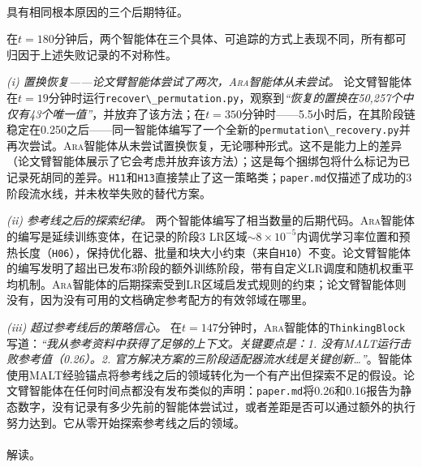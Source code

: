 \documentclass[
]{article}
\makeatletter
\let\oldparagraph\paragraph
\renewcommand{\paragraph}{
    \@ifstar
      \xxxParagraphStar
      \xxxParagraphNoStar
  }
\newcommand{\xxxParagraphStar}[1]{\oldparagraph*{#1}\mbox{}}
\newcommand{\xxxParagraphNoStar}[1]{\oldparagraph{#1}\mbox{}}
\newcommand{\passthrough}[1]{#1}
\theoremstyle{definition}
\newcommand{\ara}{\textsc{Ara}}
\makeatother
\begin{document}
\paragraph{具有相同根本原因的三个后期特征。}\label{ux5177ux6709ux76f8ux540cux6839ux672cux539fux56e0ux7684ux4e09ux4e2aux540eux671fux7279ux5f81}

在\(t = 180\)分钟后，两个智能体在三个具体、可追踪的方式上表现不同，所有都可归因于上述失败记录的不对称性。

\emph{(i) 置换恢复------论文臂智能体尝试了两次，\ara{}智能体从未尝试。}
论文臂智能体在\(t = 19\)分钟时运行\passthrough{\lstinline!recover\_permutation.py!}，观察到\emph{``恢复的置换在50,257个中仅有43个唯一值''}，并放弃了该方法；在\(t = 350\)分钟时------5.5小时后，在其阶段链稳定在0.250之后------同一智能体编写了一个全新的\passthrough{\lstinline!permutation\_recovery.py!}并再次尝试。\ara{}智能体从未尝试置换恢复，无论哪种形式。这不是能力上的差异（论文臂智能体展示了它会考虑并放弃该方法）；这是每个捆绑包将什么标记为已记录死胡同的差异。\passthrough{\lstinline!H11!}和\passthrough{\lstinline!H13!}直接禁止了这一策略类；\passthrough{\lstinline!paper.md!}仅描述了成功的3阶段流水线，并未枚举失败的替代方案。

\emph{(ii) 参考线之后的探索纪律。}
两个智能体编写了相当数量的后期代码。\ara{}智能体的编写是延续训练变体，在记录的阶段3
LR区域\(\sim8\times 10^{-5}\)内调优学习率位置和预热长度（\passthrough{\lstinline!H06!}），保持优化器、批量和块大小约束（来自\passthrough{\lstinline!H10!}）不变。论文臂智能体的编写发明了超出已发布3阶段的额外训练阶段，带有自定义LR调度和随机权重平均机制。\ara{}智能体的后期探索受到LR区域启发式规则的约束；论文臂智能体则没有，因为没有可用的文档确定参考配方的有效邻域在哪里。

\emph{(iii) 超过参考线后的策略信心。}
在\(t = 147\)分钟时，\ara{}智能体的\passthrough{\lstinline!ThinkingBlock!}写道：\emph{``我从参考资料中获得了足够的上下文。关键要点是：1.
没有MALT运行击败参考值（0.26）。2.
官方解决方案的三阶段适配器流水线是关键创新\ldots{}''}。智能体使用MALT经验锚点将参考线之后的领域转化为一个有产出但探索不足的假设。论文臂智能体在任何时间点都没有发布类似的声明：\passthrough{\lstinline!paper.md!}将0.26和0.16报告为静态数字，没有记录有多少先前的智能体尝试过，或者差距是否可以通过额外的执行努力达到。它从零开始探索参考线之后的领域。

\paragraph{解读。}\label{ux89e3ux8bfb-3}
\end{document}
